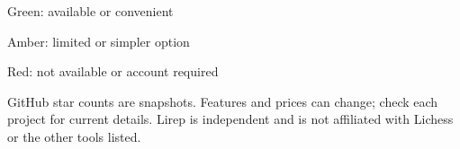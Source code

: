 \documentclass[10pt]{article}
\begin{document}
\vspace{3mm}
{\color{muted}\small
\colorbox{goodbg}{\strut\;Green: available or convenient\;}
\quad
\colorbox{okbg}{\strut\;Amber: limited or simpler option\;}
\quad
\colorbox{badbg}{\strut\;Red: not available or account required\;}
\quad
GitHub star counts are snapshots. Features and prices can change; check each project for current details. Lirep is independent and is not affiliated with Lichess or the other tools listed.\par}
\end{document}
